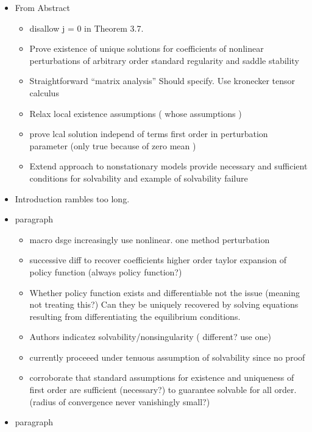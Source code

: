 \documentclass[12pt]{article}
\begin{document}
\begin{itemize}
\item  From Abstract

\begin{itemize}
\item disallow j = 0 in Theorem 3.7.
\item Prove existence of unique solutions for coefficients of nonlinear perturbations of arbitrary order standard regularity and saddle stability
\item Straightforward ``matrix analysis'' Should specify. Use kronecker tensor calculus
\item Relax local existence assumptions  ( whose assumptions )
\item prove lcal solution independ of terms first order in perturbation parameter  (only true because of zero mean )
\item Extend approach to nonstationary models provide necessary and sufficient conditions for solvability and example of solvability failure
\end{itemize}

\item Introduction rambles too long.

\item paragraph
\begin{itemize}
\item macro dsge increasingly use nonlinear. one method perturbation
\item successive diff to recover coefficients higher order taylor expansion of policy function  (always policy function?)
\item Whether policy function exists and differentiable not the issue (meaning not treating this?)  Can they be uniquely recovered by solving equations resulting from differentiating the equilibrium conditions.
\item Authors indicatez solvability/nonsingularity ( different? use one)
\item currently proceeed under tenuous assumption of solvability since no proof
\item corroborate that standard assumptions for existence and uniqueness of first order are sufficient  (necessary?)  to guarantee solvable for all order.  (radius of convergence never vanishingly small?)
\end{itemize}


\item paragraph


\end{itemize}
\end{document}
